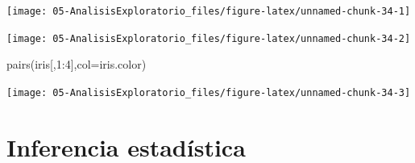 \documentclass[
]{book}
\newenvironment{Shaded}{\begin{snugshade}}{\end{snugshade}}
\newcommand{\AttributeTok}[1]{\textcolor[rgb]{0.77,0.63,0.00}{#1}}
\newcommand{\DecValTok}[1]{\textcolor[rgb]{0.00,0.00,0.81}{#1}}
\newcommand{\FunctionTok}[1]{\textcolor[rgb]{0.00,0.00,0.00}{#1}}
\newcommand{\NormalTok}[1]{#1}
\newcommand{\OtherTok}[1]{\textcolor[rgb]{0.56,0.35,0.01}{#1}}
\newcommand{\SpecialCharTok}[1]{\textcolor[rgb]{0.00,0.00,0.00}{#1}}
\newcommand{\StringTok}[1]{\textcolor[rgb]{0.31,0.60,0.02}{#1}}
\theoremstyle{break}
\begin{document}
\begin{center}\texttt{[image: 05-AnalisisExploratorio\_files/figure-latex/unnamed-chunk-34-1]} \end{center}

\begin{Shaded}
\end{Shaded}

\begin{center}\texttt{[image: 05-AnalisisExploratorio\_files/figure-latex/unnamed-chunk-34-2]} \end{center}

\begin{Shaded}
\begin{Highlighting}[]
\FunctionTok{pairs}\NormalTok{(iris[,}\DecValTok{1}\SpecialCharTok{:}\DecValTok{4}\NormalTok{],}\AttributeTok{col=}\NormalTok{iris.color)}
\end{Highlighting}
\end{Shaded}

\begin{center}\texttt{[image: 05-AnalisisExploratorio\_files/figure-latex/unnamed-chunk-34-3]} \end{center}

\hypertarget{inferencia-estaduxedstica}{%
\chapter{Inferencia estadística}\label{inferencia-estaduxedstica}}
\end{document}
